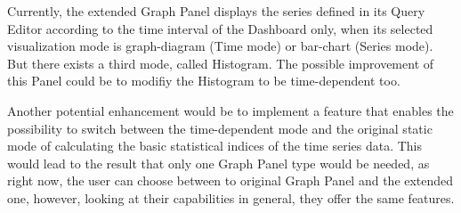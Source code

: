 Currently, the extended Graph Panel displays the series defined in its Query Editor according to the time interval of the Dashboard only, when its selected visualization mode is graph-diagram (Time mode) or bar-chart (Series mode). But there exists a third mode, called Histogram. The possible improvement of this Panel could be to modifiy the Histogram to be time-dependent too.

Another potential enhancement would be to implement a feature that enables the possibility to switch between the time-dependent mode and the original static mode of calculating the basic statistical indices of the time series data. This would lead to the result that only one Graph Panel type would be needed, as right now, the user can choose between to original Graph Panel and the extended one, however, looking at their capabilities in general, they offer the same features.